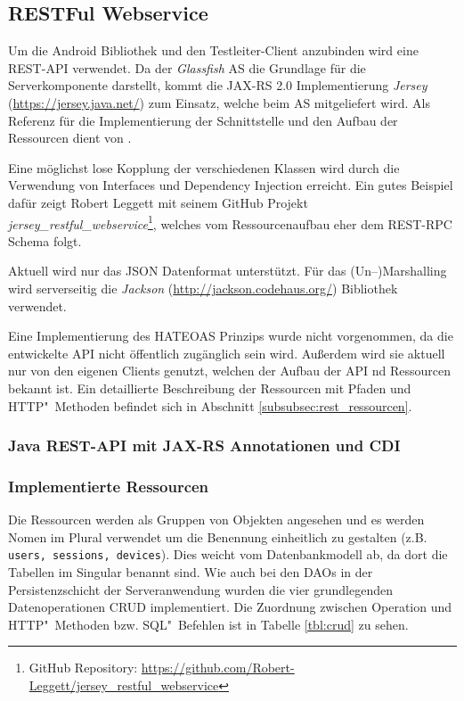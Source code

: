 \subsection{RESTFul Webservice}
Um die Android Bibliothek und den Testleiter-Client anzubinden wird eine \ac{REST}-\ac{API} verwendet.
Da der \emph{Glassfish} \ac{AS} die Grundlage für die Serverkomponente darstellt, kommt die \ac{JAX-RS} 2.0 Implementierung \emph{Jersey} (\url{https://jersey.java.net/}) zum Einsatz, welche beim \ac{AS} mitgeliefert wird.
Als Referenz für die Implementierung der Schnittstelle und den Aufbau der Ressourcen dient  von \citeauthor{Burke.2014} \cite{Burke.2014}.

Eine möglichst lose Kopplung der verschiedenen Klassen wird durch die Verwendung von Interfaces und Dependency Injection erreicht.
Ein gutes Beispiel dafür zeigt Robert Leggett mit seinem GitHub Projekt \emph{jersey\_restful\_webservice}\footnote{GitHub Repository: \url{https://github.com/Robert-Leggett/jersey_restful_webservice}}, welches vom Ressourcenaufbau eher dem \ac{REST}-\ac{RPC} Schema folgt.

Aktuell wird nur das \ac{JSON} Datenformat unterstützt.
Für das (Un--)Marshalling wird serverseitig die \emph{Jackson} (\url{http://jackson.codehaus.org/}) Bibliothek verwendet.

Eine Implementierung des \ac{HATEOAS} Prinzips \cite[vgl.][11-13]{Burke.2014} wurde nicht vorgenommen, da die entwickelte \ac{API} nicht öffentlich zugänglich sein wird.
Außerdem wird sie aktuell nur von den eigenen Clients genutzt, welchen der Aufbau der \ac{API} nd Ressourcen bekannt ist.
Ein detaillierte Beschreibung der Ressourcen mit Pfaden und \ac{HTTP}"~Methoden befindet sich in Abschnitt \ref{subsubsec:rest_ressourcen}.

\subsubsection{Java REST-API mit JAX-RS Annotationen und CDI}

\subsubsection{Implementierte Ressourcen\label{subsubsec:rest_ressourcen}}
Die Ressourcen werden als Gruppen von Objekten angesehen und es werden Nomen im Plural verwendet \cite[vgl.][20\psqq]{Burke.2014} um die Benennung einheitlich zu gestalten (z.B. \texttt{users, sessions, devices}).
Dies weicht vom Datenbankmodell ab, da dort die Tabellen im Singular benannt sind. %
Wie auch bei den \acp{DAO} in der Persistenzschicht der Serveranwendung wurden die vier grundlegenden Datenoperationen \ac{CRUD} implementiert.
Die Zuordnung zwischen Operation und \ac{HTTP}"~Methoden bzw. \ac{SQL}"~Befehlen ist in Tabelle \ref{tbl:crud} zu sehen.

